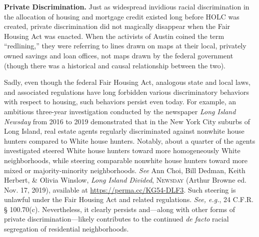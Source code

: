 \begin{questions}[]
\item \textbf{Private Discrimination.} Just as widespread invidious racial
discrimination in the allocation of housing and mortgage credit existed long
before HOLC was created, private discrimination did not magically disappear
when the Fair Housing Act was enacted. When the activists of Austin coined the
term ``redlining,'' they were referring to lines drawn on maps at their local,
privately owned savings and loan offices, not maps drawn by the federal
government (though there was a historical and causal relationship between the
two).

Sadly, even though the federal Fair Housing Act, analogous state and local laws,
and associated regulations have long forbidden various discriminatory behaviors
with respect to housing, such behaviors persist even today. For example, an
ambitious three-year investigation conducted by the newspaper \textit{Long
Island Newsday} from 2016 to 2019 demonstrated that in the New York City
suburbs of Long Island, real estate agents regularly discriminated against
nonwhite house hunters compared to White house hunters. Notably, about a
quarter of the agents investigated steered White house hunters toward more
homogeneously White neighborhoods, while steering comparable nonwhite house
hunters toward more mixed or majority-minority neighborhoods. \textit{See }Ann
Choi, Bill Dedman, Keith Herbert, \& Olivia Winslow, \textit{Long Island
Divided}, \textsc{Newsday} (Arthur Browne ed. Nov. 17, 2019), available at 
\url{https://perma.cc/KG54-DLF3}. Such steering is unlawful under the Fair
Housing Act and related regulations. \textit{See, e.g.}, 24 C.F.R. {\S}
100.70(c). Nevertheless, it clearly persists and---along with other forms of
private discrimination---likely contributes to the continued \textit{de facto}
racial segregation of residential neighborhoods.
\end{questions}
